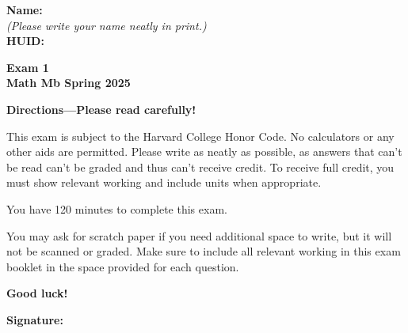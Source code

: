 \documentclass{article}
\begin{document}
{\large \mbox{} \hfill \bf Name:\underline{\hspace{3in}}}\\[2pt]
{\mbox{} \hfill \it (Please write your name neatly in print.)}\\[12pt]
{\large \mbox{} \hfill \bf HUID:\underline{\hspace{3in}}}
 
\medskip
 
\noindent
{\large\bf
Exam 1\\
Math Mb Spring 2025}
\noindent


{\Large
\begin{center}\textbf{Directions---Please read carefully!} \end{center}}


This exam is subject to the Harvard College Honor Code. No calculators or any other aids are permitted.  Please write as neatly as possible, as answers that can't be read can't be graded and thus can't receive credit. To receive full credit, you must show relevant working
and include units when appropriate. 

You have 120 minutes to complete this exam. 

You may ask for scratch paper if you need additional space to write, but it will not be scanned or graded. Make sure to include all relevant working in this exam booklet in the space provided for each question.

\begin{center}\textbf{Good luck!}\end{center}


\vfill

\vspace{0.3in}

{\large \mbox{} \hfill \bf Signature:\underline{\hspace{3in}}}
\thispagestyle{empty}

\newpage
\end{document}
